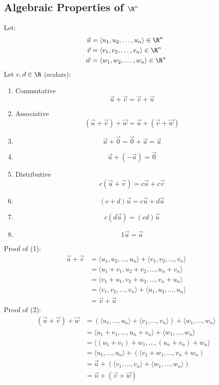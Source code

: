 \documentclass[letterpaper, 12pt]{math}
\begin{document}
\subsection*{Algebraic Properties of \( \R^{n} \)}
Let:
\begin{align*}
  \vec{u} &= \langle u_{1},u_{2},\dots,u_{n}\rangle\in\R^{n} \\
  \vec{v} &= \langle v_{1},v_{2},\dots,v_{n}\rangle\in\R^{n} \\
  \vec{w} &= \langle w_{1},w_{2},\dots,w_{n}\rangle\in\R^{n}
\end{align*}
Let \( c,d\in\R \) (scalars):
\begin{enumerate}
  \item Commutative
    \[ \vec{u}+\vec{v} = \vec{v}+\vec{u} \]
  \item Associative
    \[ (\vec{u}+\vec{v})+\vec{w} = \vec{u}+(\vec{v}+\vec{w}) \]
  \item
    \[ \vec{u}+\vec{0} = \vec{0}+\vec{u} = \vec{u} \]
  \item
    \[ \vec{u}+(-\vec{u}) = \vec{0} \]
  \item Distributive
    \[ c(\vec{u}+\vec{v}) = c\vec{u}+c\vec{v} \]
  \item
    \[ (c+d)\vec{u} = c\vec{u}+d\vec{u} \]
  \item
    \[ c(d\vec{u}) = (cd)\vec{u} \]
  \item
    \[ 1\vec{u} = \vec{u} \]
\end{enumerate}
Proof of (1):
\begin{align*}
  \vec{u}+\vec{v} &= \langle u_{1},u_{2},\dots,u_{n}\rangle+
    \langle v_{1},v_{2},\dots,v_{n}\rangle \\
  &= \langle u_{1}+v_{1},u_{2}+v_{2},\dots,u_{n}+v_{n}\rangle \\
  &= \langle v_{1}+u_{1},v_{2}+u_{2},\dots,v_{n}+u_{n}\rangle \\
  &= \langle v_{1},v_{2},\dots,v_{n}\rangle+
    \langle u_{1},u_{2},\dots,u_{n}\rangle \\
  &= \vec{v}+\vec{u}
\end{align*}
Proof of (2):
\begin{align*}
  (\vec{u}+\vec{v})+\vec{w} &= (\langle u_{1},\dots,u_{n}\rangle+
    \langle v_{1},\dots,v_{n}\rangle)+\langle w_{1},\dots,w_{n}\rangle \\
  &= \langle u_{1}+v_{1},\dots,u_{n}+v_{n}\rangle+
    \langle w_{1},\dots,w_{n}\rangle \\
  &= \langle(u_{1}+v_{1})+w_{1},\dots,(u_{n}+v_{n})+w_{n}\rangle \\
  &= \langle u_{1},\dots,u_{n}\rangle +
    (\langle v_{1}+w_{1},\dots,v_{n}+w_{n}) \\
  &= \vec{u}+(\langle v_{1},\dots,v_{n}\rangle+
    \langle w_{1},\dots,w_{n}\rangle) \\
  &= \vec{u}+(\vec{v}+\vec{w})
\end{align*}
\end{document}
